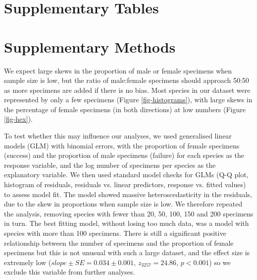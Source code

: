 \documentclass[a4paper, 12pt]{article}
\begin{document}

\newpage
\section{Supplementary Tables}



\newpage


\newpage



\newpage
\section{Supplementary Methods}

We expect large skews in the proportion of male or female specimens when sample size is low, but the ratio of male:female specimens should approach 50:50 as more specimens are added if there is no bias. 
Most species in our dataset were represented by only a few specimens (Figure \ref{fig-histograms}), with large skews in the percentage of female specimens (in both directions) at low numbers (Figure \ref{fig-hex}).

To test whether this may influence our analyses, we used generalised linear models (GLM) with binomial errors, with the proportion of female specimens (success) and the proportion of male specimens (failure) for each species as the response variable, and the log number of specimens per species as the explanatory variable. We then used standard model checks for GLMs (Q-Q plot, histogram of residuals, residuals vs. linear predictors, response vs. fitted values) to assess model fit. 
The model showed massive heteroscedasticity in the residuals, due to the skew in proportions when sample size is low. 
We therefore repeated the analysis, removing species with fewer than 20, 50, 100, 150 and 200 specimens in turn. 
The best fitting model, without losing too much data, was a model with species with more than 100 specimens. 
There is still a significant positive relationship between the number of specimens and the proportion of female specimens but this is not unusual with such a large dataset, and the effect size is extremely low ($slope \pm SE = 0.034 \pm 0.001$, $z_3257 = 24.86$, $p < 0.001$) so we exclude this variable from further analyses.
\end{document}
